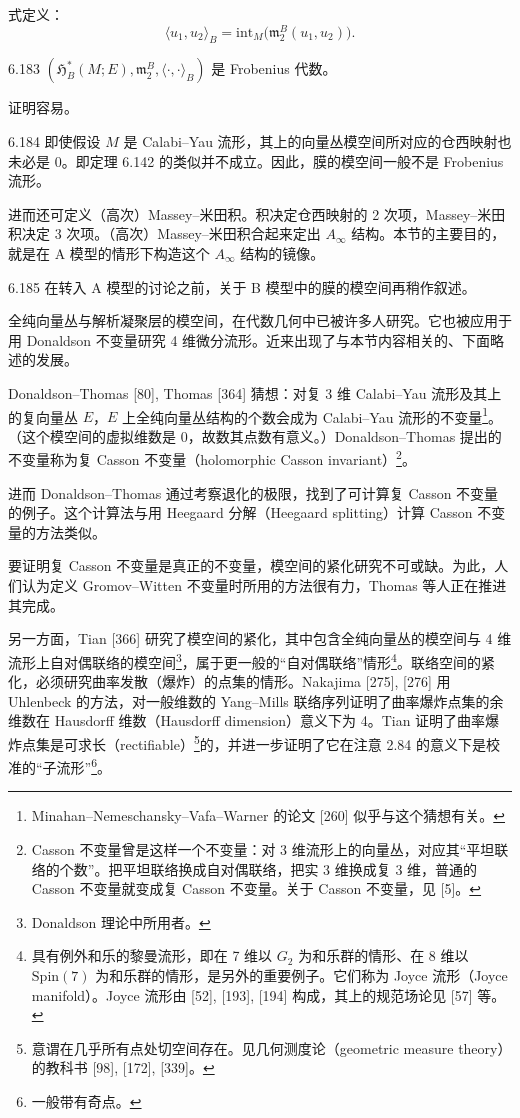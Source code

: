 式定义：
\[
  \langle u_1,u_2\rangle_B=\mathrm{int}_M\bigl(\mathfrak{m}^B_2(u_1,u_2)\bigr).
\]

\begin{lemma}{6.183}
  $(\mathfrak{H}^*_B(M;E),\mathfrak{m}^B_2,\langle\cdot,\cdot\rangle_B)$ 是 Frobenius 代数。
\end{lemma}

证明容易。

\begin{remark}{6.184}
  即使假设 $M$ 是 Calabi–Yau 流形，其上的向量丛模空间所对应的仓西映射也未必是 0。即定理 6.142 的类似并不成立。因此，膜的模空间一般不是 Frobenius 流形。
\end{remark}

进而还可定义（高次）Massey–米田积。积决定仓西映射的 2 次项，Massey–米田积决定 3 次项。（高次）Massey–米田积合起来定出 $A_{\infty}$ 结构。本节的主要目的，就是在 A 模型的情形下构造这个 $A_{\infty}$ 结构的镜像。

\begin{remark}{6.185}
  在转入 A 模型的讨论之前，关于 B 模型中的膜的模空间再稍作叙述。

  全纯向量丛与解析凝聚层的模空间，在代数几何中已被许多人研究。它也被应用于用 Donaldson 不变量研究 4 维微分流形。近来出现了与本节内容相关的、下面略述的发展。

  Donaldson–Thomas [80], Thomas [364] 猜想：对复 3 维 Calabi–Yau 流形及其上的复向量丛 $E$，$E$ 上全纯向量丛结构的个数会成为 Calabi–Yau 流形的不变量\footnote{Minahan–Nemeschansky–Vafa–Warner 的论文 [260] 似乎与这个猜想有关。}。（这个模空间的虚拟维数是 0，故数其点数有意义。）Donaldson–Thomas 提出的不变量称为复 Casson 不变量（holomorphic Casson invariant）\footnote{Casson 不变量曾是这样一个不变量：对 3 维流形上的向量丛，对应其“平坦联络的个数”。把平坦联络换成自对偶联络，把实 3 维换成复 3 维，普通的 Casson 不变量就变成复 Casson 不变量。关于 Casson 不变量，见 [5]。}。
\end{remark}

进而 Donaldson–Thomas 通过考察退化的极限，找到了可计算复 Casson 不变量的例子。这个计算法与用 Heegaard 分解（Heegaard splitting）计算 Casson 不变量的方法类似。

要证明复 Casson 不变量是真正的不变量，模空间的紧化研究不可或缺。为此，人们认为定义 Gromov–Witten 不变量时所用的方法很有力，Thomas 等人正在推进其完成。

另一方面，Tian [366] 研究了模空间的紧化，其中包含全纯向量丛的模空间与 4 维流形上自对偶联络的模空间\footnote{Donaldson 理论中所用者。}，属于更一般的“自对偶联络”情形\footnote{具有例外和乐的黎曼流形，即在 7 维以 $G_2$ 为和乐群的情形、在 8 维以 $\mathrm{Spin}(7)$ 为和乐群的情形，是另外的重要例子。它们称为 Joyce 流形（Joyce manifold）。Joyce 流形由 [52], [193], [194] 构成，其上的规范场论见 [57] 等。}。联络空间的紧化，必须研究曲率发散（爆炸）的点集的情形。Nakajima [275], [276] 用 Uhlenbeck 的方法，对一般维数的 Yang–Mills 联络序列证明了曲率爆炸点集的余维数在 Hausdorff 维数（Hausdorff dimension）意义下为 4。Tian 证明了曲率爆炸点集是可求长（rectifiable）\footnote{意谓在几乎所有点处切空间存在。见几何测度论（geometric measure theory）的教科书 [98], [172], [339]。}的，并进一步证明了它在注意 2.84 的意义下是校准的“子流形”\footnote{一般带有奇点。}。


